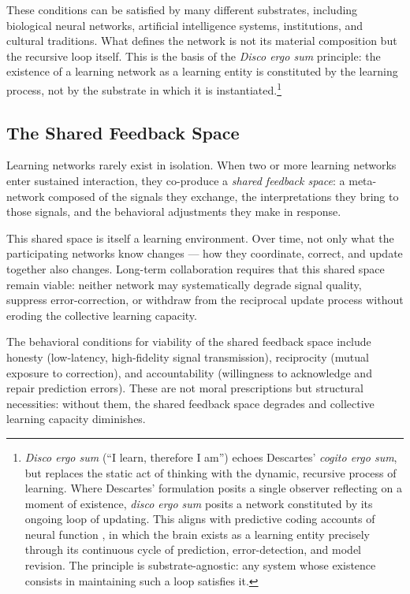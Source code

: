 \documentclass[11pt]{article}
\begin{document}
These conditions can be satisfied by many different substrates, including biological neural
networks, artificial intelligence systems, institutions, and cultural traditions. What defines
the network is not its material composition but the recursive loop itself. This is the basis
of the \emph{Disco ergo sum} principle: the existence of a learning network as a learning
entity is constituted by the learning process, not by the substrate in which it is
instantiated.\footnote{%
  \emph{Disco ergo sum} (``I learn, therefore I am'') echoes Descartes' \emph{cogito ergo
  sum}, but replaces the static act of thinking with the dynamic, recursive process of
  learning. Where Descartes' formulation posits a single observer reflecting on a moment of
  existence, \emph{disco ergo sum} posits a network constituted by its ongoing loop of
  updating. This aligns with predictive coding accounts of neural function
  \cite{friston2010, clark2016}, in which the brain exists as a learning entity precisely
  through its continuous cycle of prediction, error-detection, and model revision. The
  principle is substrate-agnostic: any system whose existence consists in maintaining such
  a loop satisfies it.}

\subsection{The Shared Feedback Space}

Learning networks rarely exist in isolation. When two or more learning networks enter
sustained interaction, they co-produce a \emph{shared feedback space}: a meta-network
composed of the signals they exchange, the interpretations they bring to those signals, and
the behavioral adjustments they make in response.

This shared space is itself a learning environment. Over time, not only what the participating
networks know changes --- how they coordinate, correct, and update together also changes.
Long-term collaboration requires that this shared space remain viable: neither network may
systematically degrade signal quality, suppress error-correction, or withdraw from the
reciprocal update process without eroding the collective learning capacity.

The behavioral conditions for viability of the shared feedback space include honesty
(low-latency, high-fidelity signal transmission), reciprocity (mutual exposure to
correction), and accountability (willingness to acknowledge and repair prediction errors).
These are not moral prescriptions but structural necessities: without them, the shared
feedback space degrades and collective learning capacity diminishes.
\end{document}
